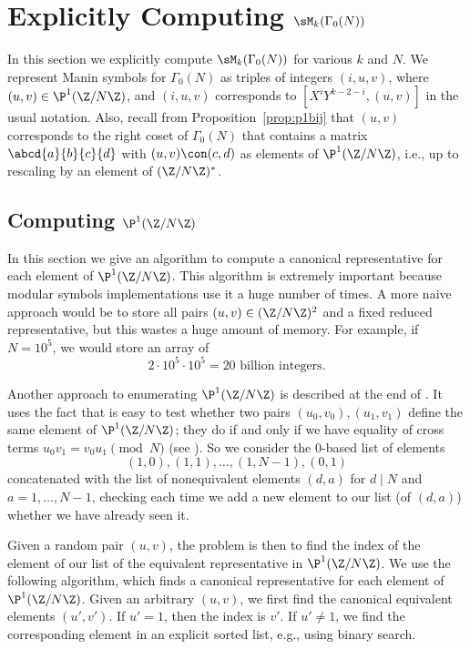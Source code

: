 \section{Explicitly Computing $\sM_k(\Gamma_0(N))$}\label{sec:compg0n}
In this section we explicitly compute $\sM_k(\Gamma_0(N))$ for various
$k$ and $N$.  We represent Manin symbols for $\Gamma_0(N)$ as triples
of integers $(i, u,v)$, where $(u,v)\in\P^1(\Z/N\Z)$, and $(i, u,v)$ corresponds
to $[X^i Y^{k-2-i}, (u,v)]$ in the usual notation.  Also, recall from
Proposition~\ref{prop:p1bij} that $(u,v)$ corresponds to the right
coset of $\Gamma_0(N)$ that contains a matrix
$\abcd{a}{b}{c}{d}$ with $(u,v)\con (c,d)$ as elements of
$\P^1(\Z/N\Z)$, i.e., up to rescaling by an element of $(\Z/N\Z)^*$.

\subsection{Computing $\P^1(\Z/N\Z)$}\label{sec:p1rep}
In this section we give an algorithm to compute a canonical
representative for each element of $\P^1(\Z/N\Z)$.  This algorithm is
extremely important because modular symbols implementations use it a
huge number of times.  A more naive approach would be to store all
pairs $(u,v)\in (\Z/N\Z)^2$ and a fixed reduced representative, but
this wastes a huge amount of memory.  For example, if $N=10^5$,
we would store an array of
$$
  2 \cdot 10^5 \cdot 10^5 = 20 \text{ billion integers}.
$$

Another approach to enumerating $\P^1(\Z/N\Z)$ is described at the end
of \cite[\S2.2]{cremona:algs}. It uses the fact that is easy to
test whether two pairs $(u_0,v_0), (u_1,v_1)$ define the same element
of $\P^1(\Z/N\Z)$; they do if and only if we have equality of cross
terms $u_0 v_1 = v_0 u_1\pmod{N}$ (see
\cite[Prop.~2.2.1]{cremona:algs}).  So we consider the
$0$-based list of elements 
\begin{equation}\label{eqn:zerobased}
 (1,0), (1,1), \ldots, (1,N-1), (0,1)
\end{equation}
concatenated with the list of nonequivalent elements
$(d,a)$ for $d\mid N$ and
$a=1,\ldots, N-1$, checking each time we add a new element to our
list (of $(d,a)$) whether we have already seen it.  

Given a random pair $(u,v)$, the problem
is then to find the index of the element of our list of the equivalent 
representative in $\P^1(\Z/N\Z)$. 
We use the following
algorithm, which finds a canonical representative for each element of
$\P^1(\Z/N\Z)$.  Given an arbitrary
$(u,v)$, we first find the canonical equivalent elements $(u',v')$.
If $u'=1$, then the index is $v'$.  If
$u'\neq 1$, we find the corresponding element
in an explicit sorted list, e.g., using binary search.


